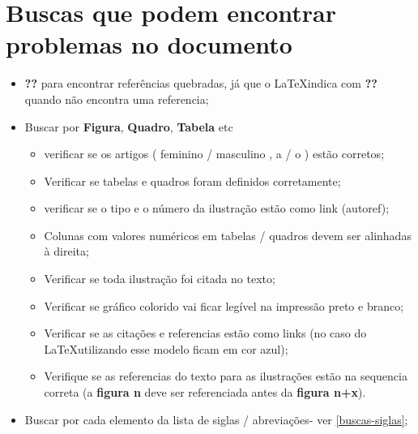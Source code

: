 \section{Buscas que podem encontrar problemas no documento}
\label{buscas-documento}

\begin{itemize}
    \item \textbf{??} para encontrar referências quebradas, já que o \LaTeX \space indica com \textbf{??} quando não encontra uma referencia;
    
    \item Buscar por \textbf{Figura}, \textbf{Quadro}, \textbf{Tabela} etc
    
        \begin{itemize}
            \item verificar se os artigos ( feminino / masculino ,  a / o  ) estão corretos;
           
            \item Verificar se tabelas e quadros foram definidos corretamente;
            
            \item verificar se o tipo e o número da ilustração estão como link (autoref);
           
            \item Colunas com valores numéricos em tabelas / quadros devem ser alinhadas à direita;
           
            \item Verificar se toda ilustração foi citada no texto;
           
            \item Verificar se gráfico colorido vai ficar legível na impressão preto e branco;
            
            \item Verificar se as citações e referencias estão como links (no caso do \LaTeX \space utilizando esse modelo ficam em cor azul);
          
            \item Verifique se as referencias do texto para as ilustrações estão na sequencia correta (a \textbf{figura n} deve ser referenciada antes da \textbf{figura n+x}).  
        \end{itemize}
        
    \item Buscar por cada elemento da lista de siglas / abreviações- ver \autoref{buscas-siglas};
    

\end{itemize}
